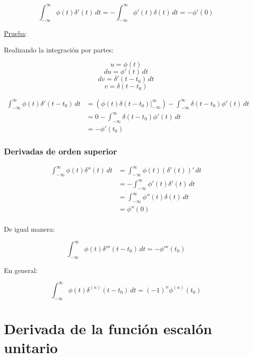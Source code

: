 \begin{equation*}
    \int_{-\infty}^{\infty}\phi(t)\delta'(t)\,dt
        =-\int_{-\infty}^{\infty}\phi'(t)\delta(t)\,dt
        =-\phi'(0)
\end{equation*}

\underline{Prueba}:

Realizando la integración por partes:

\begin{equation*}
    u=\phi(t)
\end{equation*}
\begin{equation*}
    du=\phi'(t)\,dt
\end{equation*}
\begin{equation*}
    dv=\delta'(t-t_0)\,dt
\end{equation*}
\begin{equation*}
    v=\delta(t-t_0)
\end{equation*}

\begin{equation*}
\begin{split}
    \int_{-\infty}^{\infty}\phi(t)\delta'(t-t_0)\,dt
        &=(\phi(t)\delta(t-t_0)\Big|_{-\infty}^{\infty})
        -\int_{-\infty}^{\infty}\delta(t-t_0)\phi'(t)\,dt\\
        &=0-\int_{-\infty}^{\infty}\delta(t-t_0)\phi'(t)\,dt\\
        &=-\phi'(t_0)
\end{split}
\end{equation*}

\subsubsection{Derivadas de orden superior}

\begin{equation*}
\begin{split}
    \int_{-\infty}^{\infty}\phi(t)\delta''(t)\,dt
        &=\int_{-\infty}^{\infty}\phi(t)(\delta'(t))'\,dt\\
        &=-\int_{-\infty}^{\infty}\phi'(t)\delta'(t)\,dt\\
        &=\int_{-\infty}^{\infty}\phi''(t)\delta(t)\,dt\\
        &=\phi''(0)\\
\end{split}
\end{equation*}

De igual manera:

\begin{equation*}
    \int_{-\infty}^{\infty}\phi(t)\delta'''(t-t_0)\,dt=-\phi'''(t_0)
\end{equation*}

En general:

\begin{equation*}
    \int_{-\infty}^{\infty}\phi(t)\delta^{(n)}(t-t_0)\,dt=(-1)^n\phi^{(n)}(t_0)
\end{equation*}

\section{Derivada de la función escalón unitario}

\begin{figure}[H]
    \centering
    
\end{figure}

